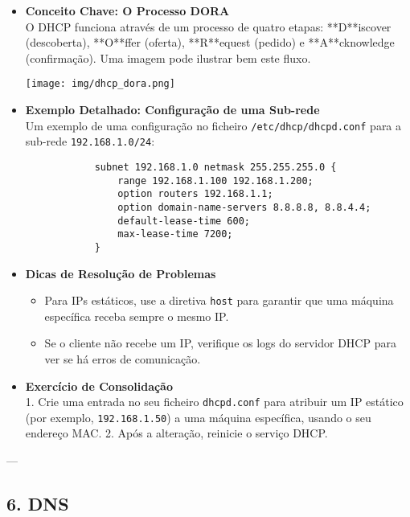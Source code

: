 \documentclass[10pt,a4paper]{article}
\begin{document}
	\begin{itemize}
		\item \textbf{Conceito Chave: O Processo DORA} \\
		O DHCP funciona através de um processo de quatro etapas: **D**iscover (descoberta), **O**ffer (oferta), **R**equest (pedido) e **A**cknowledge (confirmação). Uma imagem pode ilustrar bem este fluxo.
		
		\begin{center}
			\texttt{[image: img/dhcp\_dora.png]}
		\end{center}
		
		\item \textbf{Exemplo Detalhado: Configuração de uma Sub-rede} \\
		Um exemplo de uma configuração no ficheiro \texttt{/etc/dhcp/dhcpd.conf} para a sub-rede \texttt{192.168.1.0/24}:
		\begin{verbatim}
			subnet 192.168.1.0 netmask 255.255.255.0 {
				range 192.168.1.100 192.168.1.200;
				option routers 192.168.1.1;
				option domain-name-servers 8.8.8.8, 8.8.4.4;
				default-lease-time 600;
				max-lease-time 7200;
			}
		\end{verbatim}
		
		\item \textbf{Dicas de Resolução de Problemas} \\
		\begin{itemize}
			\item Para IPs estáticos, use a diretiva \texttt{host} para garantir que uma máquina específica receba sempre o mesmo IP.
			\item Se o cliente não recebe um IP, verifique os logs do servidor DHCP para ver se há erros de comunicação.
		\end{itemize}
		
		\item \textbf{Exercício de Consolidação} \\
		1. Crie uma entrada no seu ficheiro \texttt{dhcpd.conf} para atribuir um IP estático (por exemplo, \texttt{192.168.1.50}) a uma máquina específica, usando o seu endereço MAC.
		2. Após a alteração, reinicie o serviço DHCP.
	\end{itemize}
	
	---
	
	\subsection*{6. DNS}
	\vspace{-1.2em}
\end{document}
